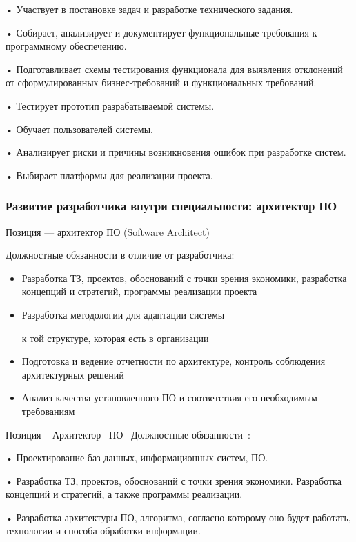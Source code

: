 \documentclass{../industrial-development}
\begin{document}
•	Участвует в постановке задач и разработке технического задания. 

•	Собирает, анализирует и документирует функциональные требования к программному обеспечению. 

•	Подготавливает схемы тестирования функционала для выявления отклонений от сформулированных бизнес-требований и функциональных требований. 

•	Тестирует прототип разрабатываемой системы. 

•	 Обучает пользователей системы. 

•	Анализирует риски и причины возникновения ошибок при разработке систем. 

•	Выбирает платформы для реализации проекта. 

\begin{frame} \frametitle{Развитие разработчика внутри специальности: архитектор ПО}
 \begin{block}{}
  \alert{Позиция --- архитектор ПО (Software Architect)}

Должностные обязанности в отличие от разработчика: 
  \end{block}
  \begin{itemize}
\item  Разработка ТЗ, проектов, обоснований с точки зрения экономики, разработка концепций и стратегий, программы реализации проекта
  \item Разработка методологии для адаптации системы

 к той структуре, которая есть в организации
  \item Подготовка и ведение отчетности по архитектуре, контроль соблюдения архитектурных решений
 \item Анализ качества установленного ПО и соответствия его необходимым требованиям
  \end{itemize}
\end{frame}

\lecturenotes

Позиция – Архитектор~\cite{hh} ПО~\cite{itcf}
Должностные обязанности~\cite{rab}: 

•	Проектирование баз данных, информационных систем, ПО. 

•	Разработка ТЗ, проектов, обоснований с точки зрения экономики. Разработка концепций и стратегий, а также программы реализации. 

•	Разработка архитектуры ПО, алгоритма, согласно которому оно будет работать, технологии и способа обработки информации. 
\end{document}
